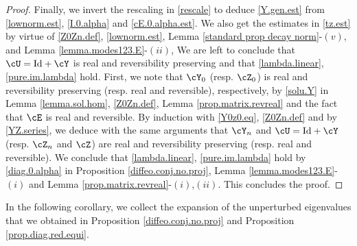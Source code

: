 \documentclass[a4paper,reqno,10pt]{article}
\begin{document}
\begin{proof}
		 Finally, we invert the rescaling in \eqref{rescale} to deduce \eqref{Y.gen.est} from \eqref{lownorm.est}, \eqref{I.0.alpha} and \eqref{cE.0.alpha.est}.
        We also get   the estimates in \eqref{tz.est} by virtue of \eqref{Z0Zn.def}, \eqref{lownorm.est}, Lemma \ref{standard prop decay norm}-$(v)$, and Lemma \ref{lemma.modes123.E}-$(ii)$, We are left to conclude that $\cU={\rm Id} + \cY$ is real and reversibility preserving and that \eqref{lambda.linear}, \eqref{pure.im.lambda} hold. First, we note that $\cY_{0}$ (resp. $\cZ_{0}$) is real and reversibility preserving (resp. real and reversible), respectively, by \eqref{solu.Y} in Lemma \ref{lemma.sol.hom}, \eqref{Z0Zn.def}, Lemma \ref{prop.matrix.revreal} and the fact that $\cE$ is real and reversible. By induction with \eqref{Y0z0.eq}, \eqref{Z0Zn.def} and by \eqref{YZ.series}, we deduce with the same arguments that $\cY_{n}$ and $\cU={\rm Id} + \cY$ (resp. $\cZ_{n}$ and $\cZ$) are real and reversibility preserving (resp. real and reversible). We conclude that \eqref{lambda.linear}, \eqref{pure.im.lambda} hold by \eqref{diag.0.alpha} in Proposition \ref{diffeo.conj.no.proj}, Lemma \ref{lemma.modes123.E}-$(i)$ and Lemma \ref{prop.matrix.revreal}-$(i)$,$(ii)$. This concludes the proof.
\end{proof}
In the following corollary, we collect the expansion of the unperturbed eigenvalues that we obtained in Proposition \ref{diffeo.conj.no.proj} and Proposition \ref{prop.diag.red.equi}.
\end{document}
